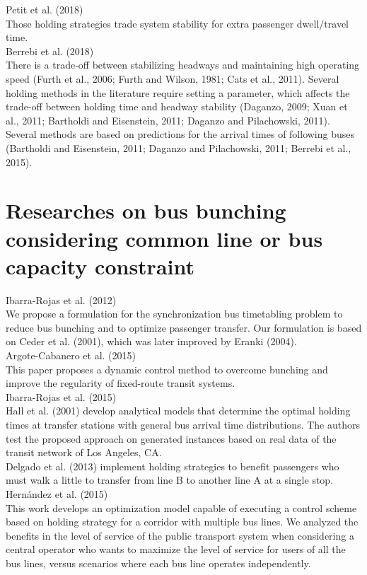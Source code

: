 \documentclass{article}
\begin{document}
\noindent \textrm{Petit et al. (2018)}\\
Those holding strategies trade system stability for extra passenger dwell/travel time.\\

\noindent \textrm{Berrebi et al. (2018)}\\
There is a trade-off between stabilizing headways and maintaining high operating speed 
\textrm{(Furth et al., 2006; Furth and Wilson, 1981; Cats et al., 2011)}.
Several holding methods in the literature require setting a parameter, 
which affects the trade-off between holding time and headway stability 
\textrm{(Daganzo, 2009; Xuan et al., 2011; Bartholdi and Eisenstein, 2011; Daganzo and Pilachowski, 2011)}.
Several methods are based on predictions for the arrival times of following buses 
\textrm{(Bartholdi and Eisenstein, 2011; Daganzo and Pilachowski, 2011; Berrebi et al., 2015)}.


\section{Researches on bus bunching considering common line or bus capacity constraint}
\noindent Ibarra-Rojas et al. (2012)\\
We propose a formulation for the synchronization bus timetabling problem to reduce bus bunching 
and to optimize passenger transfer. 
Our formulation is based on Ceder et al. (2001), which was later improved by Eranki (2004).\\

\noindent Argote-Cabanero et al. (2015)\\
This paper proposes a dynamic control method to overcome bunching and improve the regularity of fixed-route transit systems.\\

\noindent Ibarra-Rojas et al. (2015)\\
Hall et al. (2001) develop analytical models that determine the optimal holding times at transfer stations with general bus arrival time distributions. 
The authors test the proposed approach on generated instances based on real data of the transit network of Los Angeles, CA.\\
Delgado et al. (2013) implement holding strategies to benefit passengers who must walk a little to transfer from line B to
another line A at a single stop.\\

\noindent Hernández et al. (2015)\\
This work develops an optimization model capable of executing a control scheme 
based on holding strategy for a corridor with multiple bus lines.
We analyzed the benefits in the level of service of the public transport system when considering a central operator 
who wants to maximize the level of service for users of all the bus lines, 
versus scenarios where each bus line operates independently.\\
\end{document}
